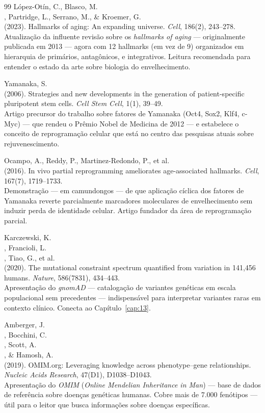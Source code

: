 \begin{thebibliography}{99}
 López-Otín, C., Blasco, M.\\, Partridge, L., Serrano, M., \& Kroemer, G.\\ (2023). Hallmarks of aging: An expanding universe. \emph{Cell}, 186(2), 243--278.\\ Atualização da influente revisão sobre os \emph{hallmarks of aging} --- originalmente publicada em 2013 --- agora com 12 hallmarks (em vez de 9) organizados em hierarquia de primários, antagônicos, e integrativos. Leitura recomendada para entender o estado da arte sobre biologia do envelhecimento.

 Yamanaka, S.\\ (2006). Strategies and new developments in the generation of patient-specific pluripotent stem cells. \emph{Cell Stem Cell}, 1(1), 39--49.\\ Artigo precursor do trabalho sobre fatores de Yamanaka (Oct4, Sox2, Klf4, c-Myc) --- que rendeu o Prêmio Nobel de Medicina de 2012 --- e estabelece o conceito de reprogramação celular que está no centro das pesquisas atuais sobre rejuvenescimento.

 Ocampo, A., Reddy, P., Martinez-Redondo, P., et al.\\ (2016). In vivo partial reprogramming ameliorates age-associated hallmarks. \emph{Cell}, 167(7), 1719--1733.\\ Demonstração --- em camundongos --- de que aplicação cíclica dos fatores de Yamanaka reverte parcialmente marcadores moleculares de envelhecimento sem induzir perda de identidade celular. Artigo fundador da área de reprogramação parcial.

 Karczewski, K.\\, Francioli, L.\\, Tiao, G., et al.\\ (2020). The mutational constraint spectrum quantified from variation in 141,456 humans. \emph{Nature}, 586(7831), 434--443.\\ Apresentação do \emph{gnomAD} --- catalogação de variantes genéticas em escala populacional sem precedentes --- indispensável para interpretar variantes raras em contexto clínico. Conecta ao Capítulo~\ref{cap:13}.

 Amberger, J.\\, Bocchini, C.\\, Scott, A.\\, \& Hamosh, A.\\ (2019). OMIM.org: Leveraging knowledge across phenotype--gene relationships. \emph{Nucleic Acids Research}, 47(D1), D1038--D1043.\\ Apresentação do \emph{OMIM} (\emph{Online Mendelian Inheritance in Man}) --- base de dados de referência sobre doenças genéticas humanas. Cobre mais de 7.000 fenótipos --- útil para o leitor que busca informações sobre doenças específicas.


\end{thebibliography}
